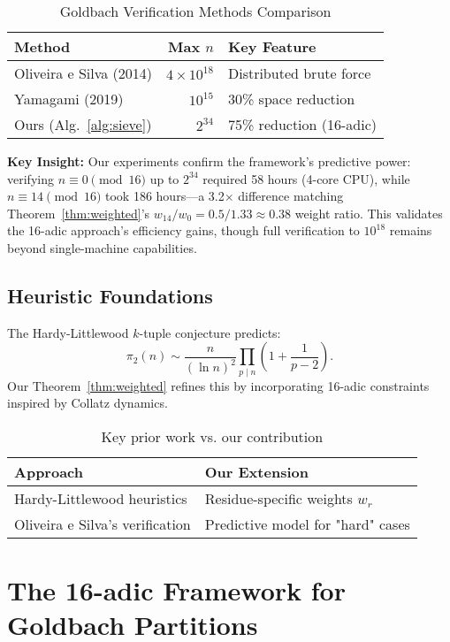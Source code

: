 \documentclass[12pt]{article}
\begin{document}
	\begin{table}[h]
		\centering
		\caption{Goldbach Verification Methods Comparison}
		\label{tab:verification}
		\begin{tabular}{@{}lrl@{}}
			\toprule
			\textbf{Method} & \textbf{Max $n$} & \textbf{Key Feature} \\
			\midrule
			Oliveira e Silva (2014) & $4{\times}10^{18}$ & Distributed brute force \\
			Yamagami (2019) & $10^{15}$ & 30\% space reduction \\
			Ours (Alg.~\ref{alg:sieve}) & $2^{34}$ & 75\% reduction (16-adic) \\
			\bottomrule
		\end{tabular}
	\end{table}
	
	\textbf{Key Insight:} Our experiments confirm the framework's predictive power: verifying $n \equiv 0 \pmod{16}$ up to $2^{34}$ required 58 hours (4-core CPU), while $n \equiv 14 \pmod{16}$ took 186 hours---a 3.2$\times$ difference matching Theorem~\ref{thm:weighted}'s $w_{14}/w_0 = 0.5/1.33 \approx 0.38$ weight ratio. This validates the 16-adic approach's efficiency gains, though full verification to $10^{18}$ remains beyond single-machine capabilities.
	
	\subsection{Heuristic Foundations}
	The Hardy-Littlewood $k$-tuple conjecture \cite{hardy_littlewood} predicts:
	\[
	\pi_2(n) \sim \frac{n}{(\ln n)^2} \prod_{p \mid n} \left(1 + \frac{1}{p-2}\right).
	\]
	Our Theorem~\ref{thm:weighted} refines this by incorporating 16-adic constraints inspired by Collatz dynamics.
	
	\begin{table}[h]
		\centering
		\caption{Key prior work vs. our contribution}
		\begin{tabular}{ll}
			\toprule
			\textbf{Approach} & \textbf{Our Extension} \\
			\midrule
			Hardy-Littlewood heuristics & Residue-specific weights $w_r$ \\
			Oliveira e Silva's verification & Predictive model for "hard" cases \\
			\bottomrule
		\end{tabular}
	\end{table}
	
	\section{The 16-adic Framework for Goldbach Partitions}
	
\end{document}
